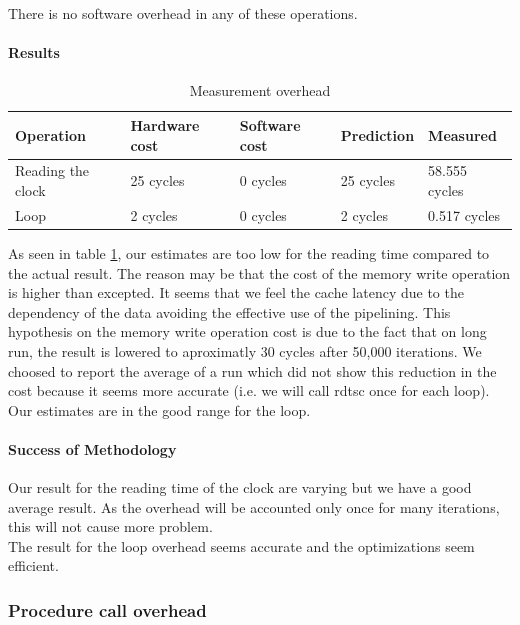 There is no software overhead in any of these operations.

\paragraph{Results}
\begin{table}[h]
\begin{center}
\begin{tabular}{| l | l | l | l | l |} \hline
Operation 			& Hardware cost 	& Software cost 	& Prediction	& Measured \\ \hline
Reading the clock 	& 25 cycles		& 0 cycles			& 25 cycles 	& 58.555 cycles \\ \hline
Loop 				& 2 cycles 		& 0 cycles & 2 cycles 	& 0.517 cycles \\ \hline
\end{tabular}
\end{center}
\caption{Measurement overhead\label{tab:measurement-overhead}}

\end{table}

As seen in table \ref{tab:measurement-overhead}, our estimates are too low for the reading time compared to the actual result.
The reason may be that the cost of the memory write operation is higher than excepted.
It seems that we feel the cache latency due to the dependency of the data avoiding the effective use of the pipelining.
This hypothesis on the memory write operation cost is due to the fact that on long run,
the result is lowered to aproximatly 30 cycles after 50,000 iterations.
We choosed to report the average of a run which did not show this reduction in
the cost because it seems more accurate (i.e. we will call rdtsc once for each
loop).\\

Our estimates are in the good range for the loop.

\paragraph{Success of Methodology}
Our result for the reading time of the clock are varying but we have a good average result.
As the overhead will be accounted only once for many iterations, this will not
cause more problem.\\

The result for the loop overhead seems accurate and the optimizations seem
efficient.

\subsubsection{Procedure call overhead}
